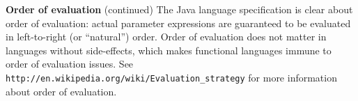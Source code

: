 \begin{minipage}[t]{\sw}
\slidenumber
\LARGE
{\bf Order of evaluation} (continued)\exx
The Java language specification is clear about order of evaluation:
actual parameter expressions are guaranteed
to be evaluated in left-to-right (or ``natural'') order.\exx
Order of evaluation does not matter in languages without side-effects,
which makes functional languages immune to order of evaluation issues.\exx
See \verb'http://en.wikipedia.org/wiki/Evaluation_strategy'
for more information about order of evaluation.
\end{minipage}
\clearpage
